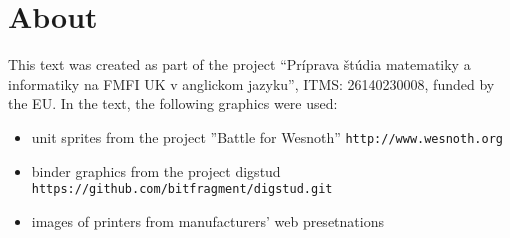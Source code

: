 \section*{About}

This text was created as part of the project ``Príprava štúdia matematiky a informatiky na FMFI UK 
v anglickom jazyku'', ITMS: 26140230008, funded by the EU.
\vfill
\noindent
In the text, the following graphics were used: \\
\begin{itemize}
  \item unit sprites from the project ''Battle for Wesnoth'' {\tt http://www.wesnoth.org}
  \item binder graphics from the project digstud {\tt https://github.com/bitfragment/digstud.git}
  \item images of printers from manufacturers' web presetnations
\end{itemize}

